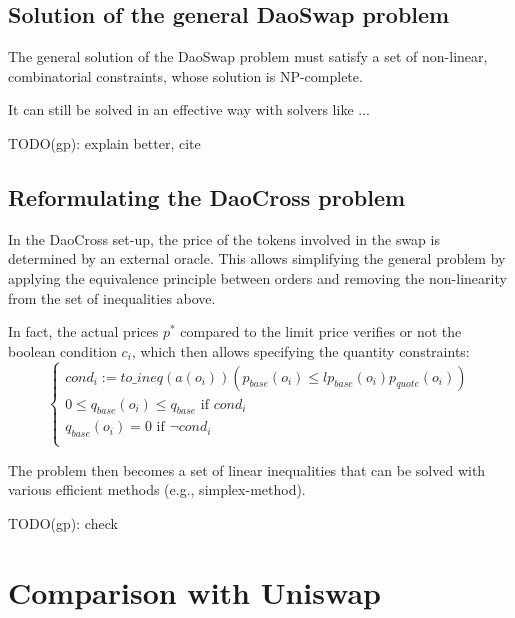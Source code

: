 \documentclass[11pt, reqno]{amsart}
\begin{document}
\subsection{Solution of the general DaoSwap problem}

The general solution of the DaoSwap problem must satisfy a set of non-linear,
combinatorial constraints, whose solution is NP-complete.

It can still be solved in an effective way with solvers like ...

TODO(gp): explain better, cite

\subsection{Reformulating the DaoCross problem}
In the DaoCross set-up, the price of the tokens involved in the swap is
determined by an external oracle.
This allows simplifying the general problem by applying the equivalence
principle between orders and removing the non-linearity from the set of
inequalities above.

In fact, the actual prices $p^*$ compared to the limit price verifies or not the
boolean condition $c_i$, which then allows specifying the quantity
constraints:
\begin{equation}
  \begin{cases}
    cond_i := \mathit{to\_ineq}(a(o_i))(p_{base}(o_i) \leq lp_{base}(o_i) p_{quote}(o_i)) \\
    0 \le q_{base}(o_i) \le q_{base} \text{ if } cond_i \\
    q_{base}(o_i) = 0 \text{ if } \lnot cond_i \\
  \end{cases}
\end{equation}

The problem then becomes a set of linear inequalities that can be solved with
various efficient methods (e.g., simplex-method).

TODO(gp): check




\section{Comparison with Uniswap}
\end{document}
